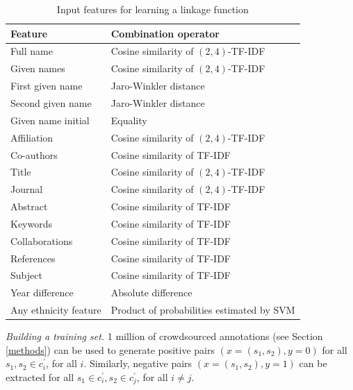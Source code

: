 \documentclass[runningheads,a4paper]{llncs}
\begin{document}
\begin{table}
\caption{Input features for learning a linkage function}
\label{table:features}
\centering
{\small
\begin{tabular}{|l|l|}
  \hline
  \textbf{Feature} & \textbf{Combination operator}\\
  \hline
  \hline
  Full name & Cosine similarity of $(2,4)$-TF-IDF\\
  Given names & Cosine similarity of $(2,4)$-TF-IDF\\
  First given name & Jaro-Winkler distance\\
  Second given name & Jaro-Winkler distance\\
  Given name initial & Equality\\
  Affiliation & Cosine similarity of $(2,4)$-TF-IDF\\
  Co-authors & Cosine similarity of TF-IDF\\
  Title & Cosine similarity of $(2,4)$-TF-IDF\\
  Journal & Cosine similarity of $(2,4)$-TF-IDF\\
  Abstract & Cosine similarity of TF-IDF\\
  Keywords & Cosine similarity of TF-IDF\\
  Collaborations & Cosine similarity of TF-IDF\\
  References & Cosine similarity of TF-IDF\\
  Subject & Cosine similarity of TF-IDF\\
  Year difference & Absolute difference\\
  \hline
  Any ethnicity feature & Product of probabilities estimated by SVM\\
  \hline
\end{tabular}}
\end{table}


\textit{Building a training set.} 1 million of crowdsourced annotations (see Section \ref{methods}) can be used to generate positive pairs $(x=(s_1, s_2), y=0)$ for all
$s_1, s_2 \in c_i^\prime$, for all $i$. Similarly, negative pairs $(x=(s_1,
s_2), y=1)$ can be extracted for all $s_1 \in c_i^\prime, s_2 \in c_j^\prime$, for
all $i \neq j$.
\end{document}
